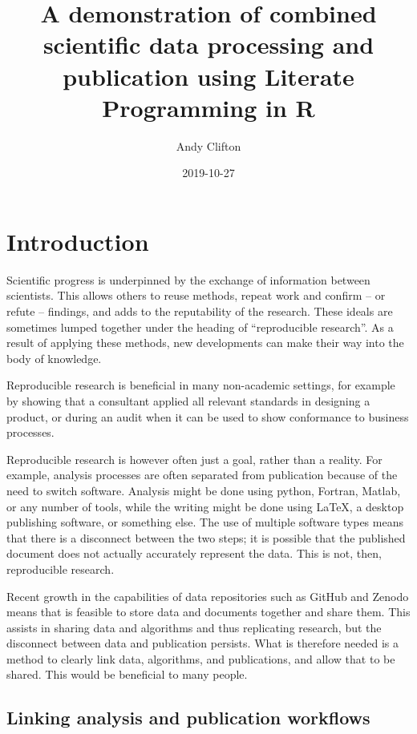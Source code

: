\documentclass[11pt,]{article}
\title{A demonstration of combined scientific data processing and publication using Literate Programming in R}
\author{Andy Clifton}
\date{2019-10-27}
\begin{document}
\maketitle

{
\hypersetup{linkcolor=black}
\setcounter{tocdepth}{2}
\tableofcontents
}
\hypertarget{sec:intro}{%
\section{Introduction}\label{sec:intro}}

Scientific progress is underpinned by the exchange of information between scientists. This allows others to reuse methods, repeat work and confirm -- or refute -- findings, and adds to the reputability of the research. These ideals are sometimes lumped together under the heading of ``reproducible research''. As a result of applying these methods, new developments can make their way into the body of knowledge.

Reproducible research is beneficial in many non-academic settings, for example by showing that a consultant applied all relevant standards in designing a product, or during an audit when it can be used to show conformance to business processes.

Reproducible research is however often just a goal, rather than a reality. For example, analysis processes are often separated from publication because of the need to switch software. Analysis might be done using python, Fortran, Matlab, or any number of tools, while the writing might be done using LaTeX, a desktop publishing software, or something else. The use of multiple software types means that there is a disconnect between the two steps; it is possible that the published document does not actually accurately represent the data. This is not, then, reproducible research.

Recent growth in the capabilities of data repositories such as GitHub and Zenodo means that is feasible to store data and documents together and share them. This assists in sharing data and algorithms and thus replicating research, but the disconnect between data and publication persists. What is therefore needed is a method to clearly link data, algorithms, and publications, and allow that to be shared. This would be beneficial to many people.

\hypertarget{linking-analysis-and-publication-workflows}{%
\subsection{Linking analysis and publication workflows}\label{linking-analysis-and-publication-workflows}}
\end{document}
